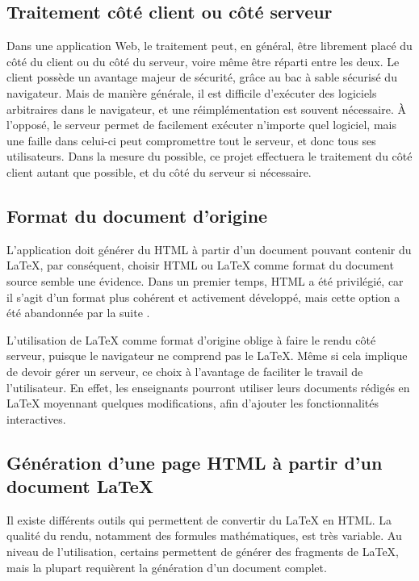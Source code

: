 \documentclass[12pt,titlepage,oneside]{article}
\renewcommand{\footnote}[1]{}
\begin{document}
\subsection{Traitement côté client ou côté serveur}
Dans une application Web, le traitement peut, en général, être librement placé du côté du client ou du côté du serveur, voire même être réparti entre les deux. Le client possède un avantage majeur de sécurité, grâce au bac à sable sécurisé du navigateur. Mais de manière générale, il est difficile d'exécuter des logiciels arbitraires dans le navigateur, et une réimplémentation est souvent nécessaire. À l'opposé, le serveur permet de facilement exécuter n'importe quel logiciel, mais une faille dans celui-ci peut compromettre tout le serveur, et donc tous ses utilisateurs. Dans la mesure du possible, ce projet effectuera le traitement du côté client autant que possible, et du côté du serveur si nécessaire.\par

\newpage

\subsection{Format du document d'origine}
L'application doit générer du HTML à partir d'un document pouvant contenir du LaTeX, par conséquent, choisir HTML ou LaTeX comme format du document source semble une évidence. Dans un premier temps, HTML a été privilégié, car il s'agit d'un format plus cohérent et activement développé, mais cette option a été abandonnée par la suite \footnote{voir \nameref{AlternativesConsidérées}}.\par
L'utilisation  de LaTeX comme format d'origine oblige à faire le rendu côté serveur, puisque le navigateur ne comprend pas le LaTeX. Même si cela implique de devoir gérer un serveur, ce choix à l'avantage de faciliter le travail de l'utilisateur. En effet, les enseignants pourront utiliser leurs documents rédigés en LaTeX moyennant quelques modifications, afin d'ajouter les fonctionnalités interactives.\par

\subsection{Génération d'une page HTML à partir d'un document LaTeX}
Il existe différents outils \footnote{voir \nameref{Outils}} qui permettent de convertir du LaTeX en HTML. La qualité du rendu, notamment des formules mathématiques, est très variable. Au niveau de l'utilisation, certains permettent de générer des fragments de LaTeX, mais la plupart requièrent la génération d'un document complet.\par
\end{document}
